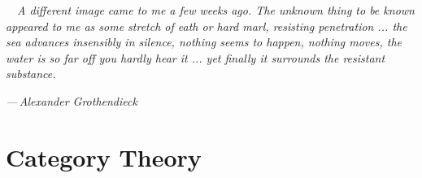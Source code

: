 \epigraph{$\quad$\emph{A different image came to me a few weeks ago. The unknown thing to be known appeared to me as some stretch of eath or hard marl, resisting penetration ... the sea advances insensibly in silence, nothing seems to happen, nothing moves, the water is so far off you hardly hear it ... yet finally it surrounds the resistant substance.}}{\emph{—\,Alexander Grothendieck}}
\section{Category Theory}
